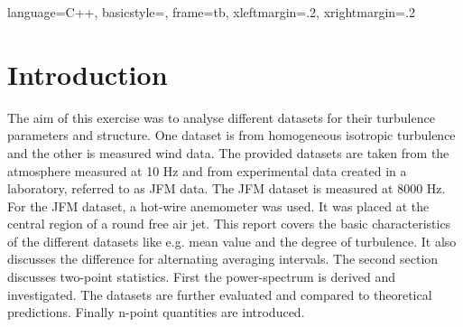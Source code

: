 \documentclass[12pt]{article}
\begin{document}
\lstset
{
	language=C++,
	basicstyle=\footnotesize,
	frame=tb,
	xleftmargin=.2\textwidth,
	xrightmargin=.2\textwidth
}
\onehalfspacing

\tableofcontents
\newpage
\listoffigures
\listoftables

\newpage
\section{Introduction}
The aim of this exercise was to analyse different datasets for their turbulence parameters and structure. One dataset is from homogeneous isotropic turbulence and the other is measured wind data.
The provided datasets are taken from the atmosphere measured at 10 Hz and from experimental data created in a laboratory, referred to as JFM data. The JFM dataset is measured at 8000 Hz. For the JFM dataset, a hot-wire anemometer was used. It was placed at the central region of a round free air jet. \cite{markov}
This report covers the basic characteristics of the different datasets like e.g. mean value and the degree of turbulence. It also discusses the difference for alternating averaging intervals. 
The second section discusses two-point statistics. First the power-spectrum is derived and investigated. The datasets are further evaluated and compared to theoretical predictions.
Finally n-point quantities are introduced.
\end{document}

